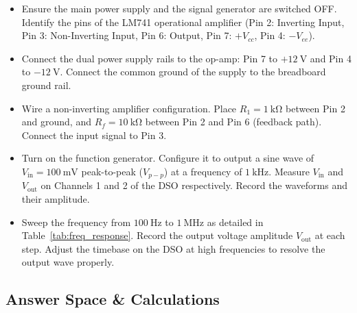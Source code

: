 \begin{itemize}[label=\checkbox, leftmargin=*, itemsep=0.8em]
    \item Ensure the main power supply and the signal generator are switched OFF. Identify the pins of the LM741 operational amplifier (Pin 2: Inverting Input, Pin 3: Non-Inverting Input, Pin 6: Output, Pin 7: $+V_{cc}$, Pin 4: $-V_{ee}$). 
    
    \item Connect the dual power supply rails to the op-amp: Pin 7 to $+\SI{12}{\volt}$ and Pin 4 to $-\SI{12}{\volt}$. Connect the common ground of the supply to the breadboard ground rail. 
    
    \item Wire a non-inverting amplifier configuration. Place $R_1 = \SI{1}{\kilo\ohm}$ between Pin 2 and ground, and $R_f = \SI{10}{\kilo\ohm}$ between Pin 2 and Pin 6 (feedback path). Connect the input signal to Pin 3. 
    
    \item Turn on the function generator. Configure it to output a sine wave of $V_{\text{in}} = \SI{100}{\milli\volt}$ peak-to-peak ($V_{p-p}$) at a frequency of $\SI{1}{\kilo\hertz}$. Measure $V_{\text{in}}$ and $V_{\text{out}}$ on Channels 1 and 2 of the DSO respectively. Record the waveforms and their amplitude. 
    
    \item Sweep the frequency from $\SI{100}{\hertz}$ to $\SI{1}{\mega\hertz}$ as detailed in Table~\ref{tab:freq_response}. Record the output voltage amplitude $V_{\text{out}}$ at each step. Adjust the timebase on the DSO at high frequencies to resolve the output wave properly. 
\end{itemize}

\subsection{Answer Space \& Calculations}


\newpage

